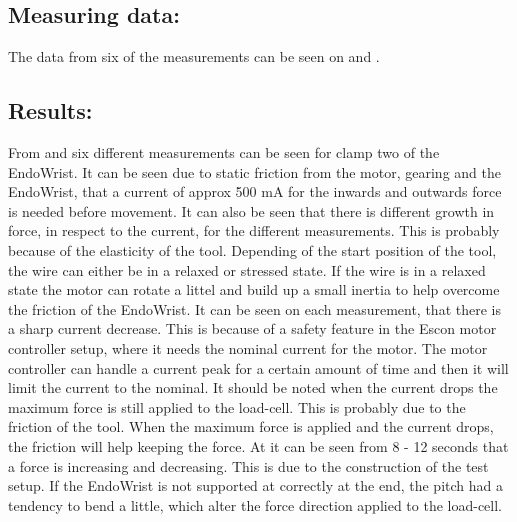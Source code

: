 \subsection*{Measuring data:}
The data from six of the measurements can be seen on  and .






\subsection*{Results:}
From  and  six different measurements can be seen for clamp two of the EndoWrist.
It can be seen due to static friction from the motor, gearing and the EndoWrist, that a current of approx 500 mA for the inwards and outwards force is needed before movement. It can also be seen that there is different growth in force, in respect to the current, for the different measurements. This is probably because of the elasticity of the tool. Depending of the start position of the tool, the wire can either be in a relaxed or stressed state. If the wire is in a relaxed state the motor can rotate a littel and build up a small inertia to help overcome the friction of the EndoWrist. It can be seen on each measurement, that there is a sharp current decrease. This is because of a safety feature in the Escon motor controller setup, where it needs the nominal current for the motor. The motor controller can handle a current peak for a certain amount of time and then it will limit the current to the nominal. It should be noted when the current drops the maximum force is still applied to the load-cell. This is probably due to the friction of the tool. When the maximum force is applied and the current drops, the friction will help keeping the force. At  it can be seen from 8 - 12 seconds that a force is increasing and decreasing. This is due to the construction of the test setup. If the EndoWrist is not supported at correctly at the end, the pitch had a tendency to bend a little, which alter the force direction applied to the load-cell.

